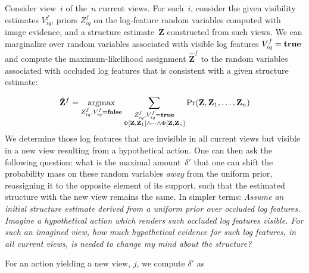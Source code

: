 Consider view~$i$ of the~$n$ current views.
%
For such~$i$, consider the given visibility estimates $V^f_{iq}$, priors
$Z^f_{iq}$ on the log-feature random variables computed with image evidence,
and a structure estimate~$\mathbf{Z}$ constructed from such views.
%
We can marginalize over random variables associated with visible log features
$V^f_{iq} = \mathbf{true}$ and compute the maximum-likelihood assignment
$\hat{\mathbf{Z}}^f$ to the random variables associated with occluded log
features that is consistent with a given structure estimate:

\par\vspace*{-2.5ex}
\begin{equation*}
  \hat{\mathbf{Z}}^f=\argmax_{\substack{Z^f_{iq},V^f_{iq}=\false}}
  \sum_{\substack{Z^f_{iq},V^f_{iq}=\true\\
      \Phi[\mathbf{Z},\mathbf{Z}_1]\wedge\cdots\wedge\Phi[\mathbf{Z},\mathbf{Z}_n]}}
  \Pr(\mathbf{Z},\mathbf{Z}_1,\ldots,\mathbf{Z}_n)
  \vspace*{-0.5ex}
\end{equation*}
%
We determine those log features that are invisible in all current views but
visible in a new view resulting from a hypothetical action.
%
One can then ask the following question: what is the maximal amount~$\delta'$
that one can shift the probability mass on these random variables \emph{away}
from the uniform prior, reassigning it to the opposite element of its support,
such that the estimated structure with the new view remains the same.
%
In simpler terms: \emph{Assume an initial structure estimate derived from a
  uniform prior over occluded log features.
  Imagine a hypothetical action which renders such occluded log features
  visible.
  For such an imagined view, how much hypothetical evidence for such log
  features, in all current views, is needed to change my mind about the
  structure?}

\par\noindent
%
For an action yielding a new view, $j$, we compute $\delta'$ as


